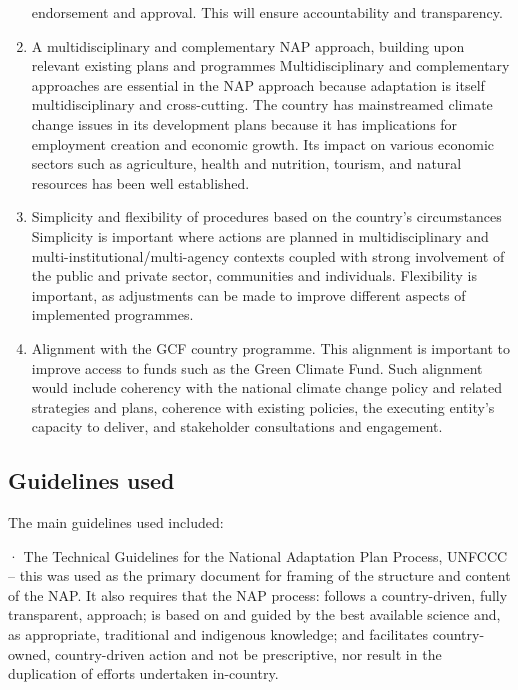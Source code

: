 \documentclass[
]{book}
\begin{document}
\begin{enumerate}
  endorsement and approval. This will ensure accountability and transparency.
\item
  A multidisciplinary and complementary NAP approach, building upon relevant existing plans and programmes
  Multidisciplinary and complementary approaches are essential in the NAP approach because adaptation is itself multidisciplinary and cross-cutting. The country
  has mainstreamed climate change issues in its development plans because it has implications for employment creation and economic growth. Its impact on various
  economic sectors such as agriculture, health and nutrition, tourism, and natural resources has been well established.
\item
  Simplicity and flexibility of procedures based on the country's circumstances
  Simplicity is important where actions are planned in multidisciplinary and multi-institutional/multi-agency contexts coupled with strong involvement of the
  public and private sector, communities and individuals. Flexibility is important, as adjustments can be made to improve different aspects of implemented
  programmes.
\item
  Alignment with the GCF country programme.
  This alignment is important to improve access to funds such as the Green Climate Fund. Such alignment would include coherency with the national climate change
  policy and related strategies and plans, coherence with existing policies, the executing entity's capacity to deliver, and stakeholder consultations and
  engagement.
\end{enumerate}

\hypertarget{guidelines-used}{%
\subsection{Guidelines used}\label{guidelines-used}}

The main guidelines used included:

· The Technical Guidelines for the National Adaptation Plan Process, UNFCCC -- this was used as the primary document for framing of the structure and content of the NAP. It also requires that the NAP process: follows a country-driven, fully transparent, approach; is based on and guided by the best available science and, as appropriate, traditional and indigenous knowledge; and facilitates country-owned, country-driven action and not be prescriptive, nor result in the duplication of efforts undertaken in-country.
\end{document}
